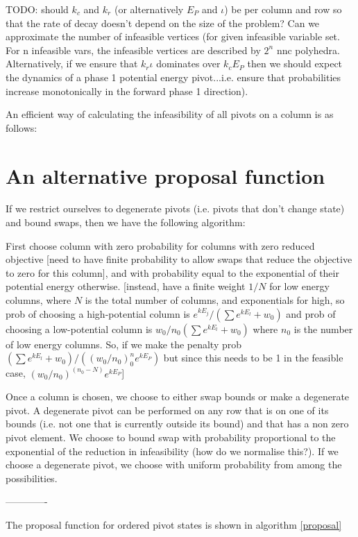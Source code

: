 \documentclass{article}
\begin{document}
TODO: should $k_c$ and $k_r$ (or alternatively $E_P$ and $\iota$) be per column and row so that the rate of decay doesn't depend on the size of the problem? Can we approximate the number of infeasible vertices (for given infeasible variable set. For n infeasible vars, the infeasible vertices are described by $2^n$ nnc polyhedra. Alternatively, if we ensure that $k_r\iota$ dominates over $k_cE_P$ then we should expect the dynamics of a phase 1 potential energy pivot...i.e. ensure that probabilities increase monotonically in the forward phase 1 direction).

An efficient way of calculating the infeasibility of all pivots on a column is as follows:

\section{An alternative proposal function}

If we restrict ourselves to degenerate pivots (i.e. pivots that don't change state) and bound swaps, then we have the following algorithm:

First choose column with zero probability for columns with zero reduced objective [need to have finite probability to allow swaps that reduce the objective to zero for this column], and with probability equal to the exponential of their potential energy otherwise. [instead, have a finite weight $1/N$ for low energy columns, where $N$ is the total number of columns, and exponentials for high, so prob of choosing a high-potential column is $e^{kE_j}/(\sum e^{kE_l} + w_0)$ and prob of choosing a low-potential column is $w_0/n_0(\sum e^{kE_l} + w_0)$ where $n_0$ is the number of low energy columns. So, if we make the penalty prob $(\sum e^{kE_l} + w_0)/((w_0/n_0)^n_0e^{kE_P})$ but since this needs to be 1 in the feasible case, $(w_0/n_0)^(n_0-N)e^{kE_P}$]

Once a column is chosen, we choose to either swap bounds or make a degenerate pivot. A degenerate pivot can be performed on any row that is on one of its bounds (i.e. not one that is currently outside its bound) and that has a non zero pivot element. We choose to bound swap with probability proportional to the exponential of the reduction in infeasibility (how do we normalise this?). If we choose a degenerate pivot, we choose with uniform probability from among the possibilities.

-------------


The proposal function for ordered pivot states is shown in algorithm \ref{proposal}
\end{document}
